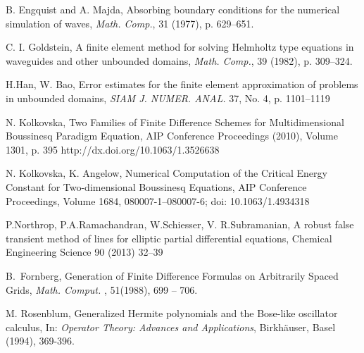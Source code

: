 \documentclass[12pt]{article}
\theoremstyle{theorem}
\theoremstyle{defi}
\begin{document}
\begin{thebibliography}{99}
 B. Engquist and A. Majda, Absorbing boundary conditions for the numerical simulation of waves, {\it Math. Comp.}, 31 (1977), p. 629–651.

  C. I. Goldstein, A finite element method for solving Helmholtz type equations in waveguides and other unbounded domains, {\it Math. Comp.}, 39 (1982), p. 309–324.

  H.Han, W. Bao, Error estimates for the finite element approximation of problems in unbounded domains,  {\it SIAM J. NUMER. ANAL.} 37, No. 4, p. 1101–1119

 N. Kolkovska, Two Families of Finite Difference Schemes for Multidimensional Boussinesq Paradigm Equation, AIP Conference Proceedings (2010), Volume 1301, p. 395 http://dx.doi.org/10.1063/1.3526638

 N. Kolkovska, K. Angelow, Numerical Computation of the Critical Energy Constant for Two-dimensional Boussinesq Equations,  AIP Conference Proceedings, Volume 1684, 080007-1–080007-6; doi: 10.1063/1.4934318

 P.Northrop, P.A.Ramachandran, W.Schiesser, V. R.Subramanian, A robust false transient method of lines for elliptic partial differential equations, Chemical Engineering Science 90 (2013) 32–39

B.~Fornberg, Generation of Finite Difference Formulas on Arbitrarily Spaced Grids, 
{\it  Math. Comput.} , 51(1988),  699 -- 706.

 M. Rosenblum,
Generalized Hermite polynomials and the Bose-like oscillator
calculus, In: {\it Operator Theory: Advances and Applications},
Birkh\"auser, Basel (1994), 369-396.

\end{thebibliography}
\end{document}
